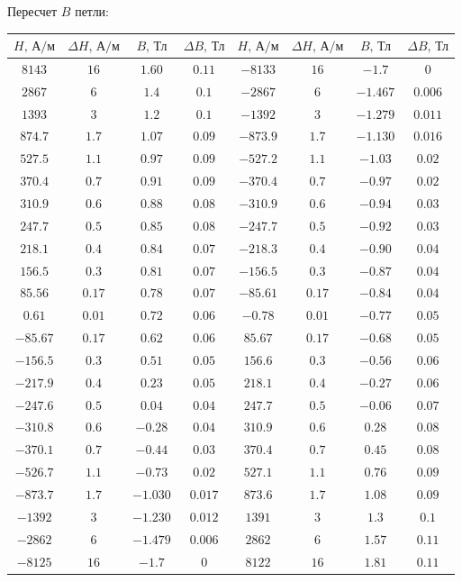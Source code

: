 \newpage
Пересчет $B$ петли:
\begin{center}
\begin{tabular}{|c|c|c|c|c|c|c|c|}\hline
$H\text{, А/м}$&$\Delta H\text{, А/м}$&$B\text{, Тл}$&$\Delta B\text{, Тл}$&$H\text{, А/м}$&$\Delta H\text{, А/м}$&$B\text{, Тл}$&$\Delta B\text{, Тл}$\\\hline
$8143$&$16$&$1.60$&$0.11$&$-8133$&$16$&$-1.7$&$0$\\\hline
$2867$&$6$&$1.4$&$0.1$&$-2867$&$6$&$-1.467$&$0.006$\\\hline
$1393$&$3$&$1.2$&$0.1$&$-1392$&$3$&$-1.279$&$0.011$\\\hline
$874.7$&$1.7$&$1.07$&$0.09$&$-873.9$&$1.7$&$-1.130$&$0.016$\\\hline
$527.5$&$1.1$&$0.97$&$0.09$&$-527.2$&$1.1$&$-1.03$&$0.02$\\\hline
$370.4$&$0.7$&$0.91$&$0.09$&$-370.4$&$0.7$&$-0.97$&$0.02$\\\hline
$310.9$&$0.6$&$0.88$&$0.08$&$-310.9$&$0.6$&$-0.94$&$0.03$\\\hline
$247.7$&$0.5$&$0.85$&$0.08$&$-247.7$&$0.5$&$-0.92$&$0.03$\\\hline
$218.1$&$0.4$&$0.84$&$0.07$&$-218.3$&$0.4$&$-0.90$&$0.04$\\\hline
$156.5$&$0.3$&$0.81$&$0.07$&$-156.5$&$0.3$&$-0.87$&$0.04$\\\hline
$85.56$&$0.17$&$0.78$&$0.07$&$-85.61$&$0.17$&$-0.84$&$0.04$\\\hline
$0.61$&$0.01$&$0.72$&$0.06$&$-0.78$&$0.01$&$-0.77$&$0.05$\\\hline
$-85.67$&$0.17$&$0.62$&$0.06$&$85.67$&$0.17$&$-0.68$&$0.05$\\\hline
$-156.5$&$0.3$&$0.51$&$0.05$&$156.6$&$0.3$&$-0.56$&$0.06$\\\hline
$-217.9$&$0.4$&$0.23$&$0.05$&$218.1$&$0.4$&$-0.27$&$0.06$\\\hline
$-247.6$&$0.5$&$0.04$&$0.04$&$247.7$&$0.5$&$-0.06$&$0.07$\\\hline
$-310.8$&$0.6$&$-0.28$&$0.04$&$310.9$&$0.6$&$0.28$&$0.08$\\\hline
$-370.1$&$0.7$&$-0.44$&$0.03$&$370.4$&$0.7$&$0.45$&$0.08$\\\hline
$-526.7$&$1.1$&$-0.73$&$0.02$&$527.1$&$1.1$&$0.76$&$0.09$\\\hline
$-873.7$&$1.7$&$-1.030$&$0.017$&$873.6$&$1.7$&$1.08$&$0.09$\\\hline
$-1392$&$3$&$-1.230$&$0.012$&$1391$&$3$&$1.3$&$0.1$\\\hline
$-2862$&$6$&$-1.479$&$0.006$&$2862$&$6$&$1.57$&$0.11$\\\hline
$-8125$&$16$&$-1.7$&$0$&$8122$&$16$&$1.81$&$0.11$\\\hline
\end{tabular}\\~\\
\end{center}


